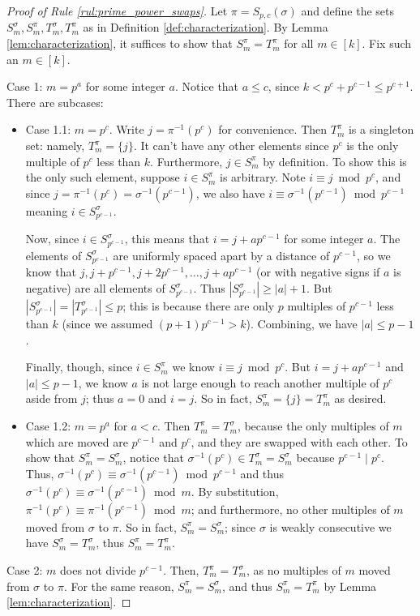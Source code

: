 \documentclass{article}
\theoremstyle{definition}
\theoremstyle{remark}
\numberwithin{equation}{section}
\numberwithin{case}{theorem}
\begin{document}
\begin{proof}[Proof of Rule \ref{rul:prime_power_swaps}]
    Let $\pi = S_{p, c}(\sigma)$ and define the sets $S_m^\sigma, S_m^\pi, T_m^\sigma, T_m^\pi$ as in Definition \ref{def:characterization}. By Lemma \ref{lem:characterization}, it suffices to show that $S_m^\pi = T_m^\pi$ for all $m \in [k]$. Fix such an $m \in [k]$.
    
    Case 1: $m = p^a$ for some integer $a$. Notice that $a \leq c$, since $k < p^{c} + p^{c-1} \leq p^{c+1}$. There are subcases:
    
    \begin{itemize}
      \item Case 1.1: $m = p^c$. Write $j = \pi^{-1}(p^c)$ for convenience. Then $T_m^\pi$ is a singleton set: namely, $T_m^\pi = \{ j \}$. It can't have any other elements since $p^c$ is the only multiple of $p^c$ less than $k$. Furthermore, $j \in S_m^\pi$ by definition. To show this is the only such element, suppose $i \in S_m^{\pi}$ is arbitrary. Note $i \equiv j \bmod p^c$, and since $j = \pi^{-1}(p^c) = \sigma^{-1}(p^{c-1})$, we also have $i \equiv \sigma^{-1}(p^{c-1}) \bmod p^{c-1}$ meaning $i \in S_{p^{c-1}}^\sigma$.
    
      Now, since $i \in S_{p^{c-1}}^\sigma$, this means that $i = j + ap^{c-1}$ for some integer $a$. The elements of $S_{p^{c-1}}^\sigma$ are uniformly spaced apart by a distance of $p^{c-1}$, so we know that $j, j + p^{c-1}, j + 2p^{c-1}, \dots, j + ap^{c-1}$ (or with negative signs if $a$ is negative) are all elements of $S_{p^{c-1}}^\sigma$. Thus $|S_{p^{c-1}}^\sigma| \geq |a| + 1$. But $|S_{p^{c-1}}^\sigma| = |T_{p^{c-1}}^\sigma| \leq p$; this is because there are only $p$ multiples of $p^{c-1}$ less than $k$ (since we assumed $(p+1)p^{c-1} > k$). Combining, we have $|a| \leq p - 1$.
    
      Finally, though, since $i \in S_m^\pi$ we know $i \equiv j \bmod p^c$. But $i = j + ap^{c-1}$ and $|a| \leq p-1$, we know $a$ is not large enough to reach another multiple of $p^c$ aside from $j$; thus $a = 0$ and $i = j$. So in fact, $S_m^\pi = \{ j \} = T_m^\pi$ as desired.
      \item Case 1.2: $m = p^a$ for $a < c$. Then $T_m^\pi = T_m^\sigma$, because the only multiples of $m$ which are moved are $p^{c-1}$ and $p^c$, and they are swapped with each other. To show that $S_m^\pi = S_m^\sigma$, notice that $\sigma^{-1}(p^c) \in T_m^{\sigma} = S_m^\sigma$ because $p^{c-1} \mid p^c$. Thus, $\sigma^{-1}(p^c) \equiv \sigma^{-1}(p^{c-1}) \bmod p^{c-1}$ and thus $\sigma^{-1}(p^c) \equiv \sigma^{-1}(p^{c-1}) \bmod m$. By substitution, $\pi^{-1}(p^c) \equiv \pi^{-1}(p^{c-1}) \bmod m$; and furthermore, no other multiples of $m$ moved from $\sigma$ to $\pi$. So in fact, $S_m^\pi = S_m^\sigma$; since $\sigma$ is weakly consecutive we have $S_m^\sigma = T_m^\sigma$, thus $S_m^\pi = T_m^\pi$.
    \end{itemize}
    
    Case 2: $m$ does not divide $p^{c-1}$. Then, $T_m^\pi = T_m^\sigma$, as no multiples of $m$ moved from $\sigma$ to $\pi$. For the same reason, $S_m^\pi = S_m^\sigma$, and thus $S_m^\pi = T_m^\pi$ by Lemma \ref{lem:characterization}.
\end{proof}
\end{document}
